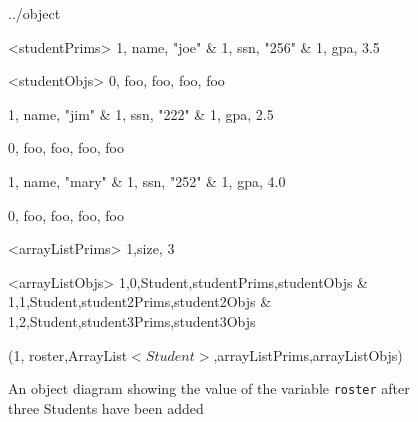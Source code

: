 \documentclass{article}
\begin{document}
\begin {figure}


\Draw

 {../object}


\Indirect \Table <studentPrims>
{ 1, name, "joe" &
  1, ssn, "256"  &
  1, gpa, 3.5  
}

\Indirect \Table <studentObjs>
{ 0, foo, foo, foo, foo }

\Indirect {}
{ 1, name, "jim" &
  1, ssn, "222"  &
  1, gpa, 2.5  
}

\Indirect {}
{ 0, foo, foo, foo, foo }

\Indirect {}
{ 1, name, "mary" &
  1, ssn, "252"  &
  1, gpa, 4.0  
}

\Indirect {}
{ 0, foo, foo, foo, foo }

\Indirect \Table <arrayListPrims>
{1,size, 3}


\Indirect \Table <arrayListObjs>
 {  1,0,Student,studentPrims,studentObjs &
    1,1,Student,student2Prims,student2Objs &
    1,2,Student,student3Prims,student3Objs }
  


\Obj (1, roster,ArrayList$<Student>$,arrayListPrims,arrayListObjs)
    
\EndDraw

\caption {An object diagram showing the value of the
variable \texttt {roster} after three Students have been
added}

\label {fig:ArrayList3}

\end {figure}
\end{document}
